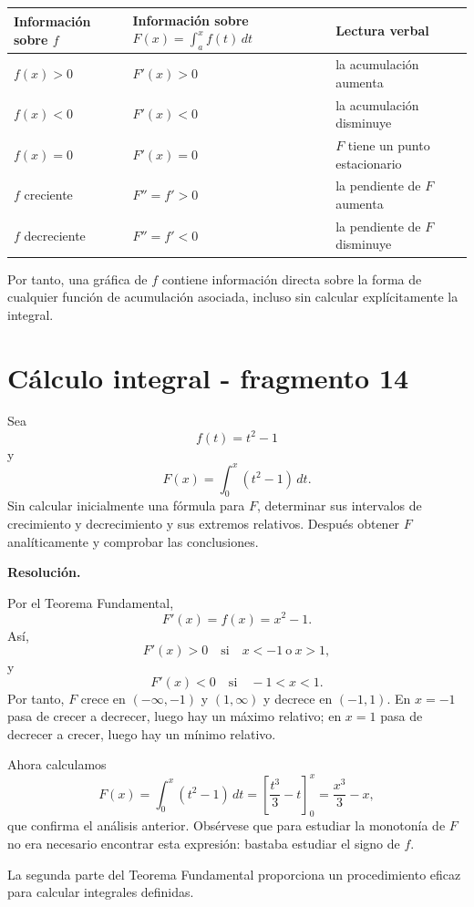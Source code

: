 \begin{center}
\begin{tabular}{p{}p{}p{}}
\toprule
Información sobre $f$ & Información sobre $F(x)=\int_a^x f(t)\,dt$ & Lectura verbal \\
\midrule
$f(x)>0$ & $F'(x)>0$ & la acumulación aumenta \\
$f(x)<0$ & $F'(x)<0$ & la acumulación disminuye \\
$f(x)=0$ & $F'(x)=0$ & $F$ tiene un punto estacionario \\
$f$ creciente & $F''=f'>0$ & la pendiente de $F$ aumenta \\
$f$ decreciente & $F''=f'<0$ & la pendiente de $F$ disminuye \\
\bottomrule
\end{tabular}
\end{center}

Por tanto, una gráfica de $f$ contiene información directa sobre la forma de cualquier función de acumulación asociada, incluso sin calcular explícitamente la integral.


\section{Cálculo integral - fragmento 14}
\begin{solvedexercise}
Sea
\[
f(t)=t^2-1
\]
y
\[
F(x)=\int_0^x(t^2-1)\,dt.
\]
Sin calcular inicialmente una fórmula para $F$, determinar sus intervalos de crecimiento y decrecimiento y sus extremos relativos. Después obtener $F$ analíticamente y comprobar las conclusiones.

\textbf{Resolución.}\par\smallskip
Por el Teorema Fundamental,
\[
F'(x)=f(x)=x^2-1.
\]
Así,
\[
F'(x)>0\quad\text{si}\quad x<-1\ \text{o}\ x>1,
\]
y
\[
F'(x)<0\quad\text{si}\quad -1<x<1.
\]
Por tanto, $F$ crece en $(-\infty,-1)$ y $(1,\infty)$ y decrece en $(-1,1)$. En $x=-1$ pasa de crecer a decrecer, luego hay un máximo relativo; en $x=1$ pasa de decrecer a crecer, luego hay un mínimo relativo.

Ahora calculamos
\[
F(x)=\int_0^x(t^2-1)\,dt
=
\left[\frac{t^3}{3}-t\right]_0^x
=
\frac{x^3}{3}-x,
\]
que confirma el análisis anterior. Obsérvese que para estudiar la monotonía de $F$ no era necesario encontrar esta expresión: bastaba estudiar el signo de $f$.
\end{solvedexercise}

La segunda parte del Teorema Fundamental proporciona un procedimiento eficaz para calcular integrales definidas.

